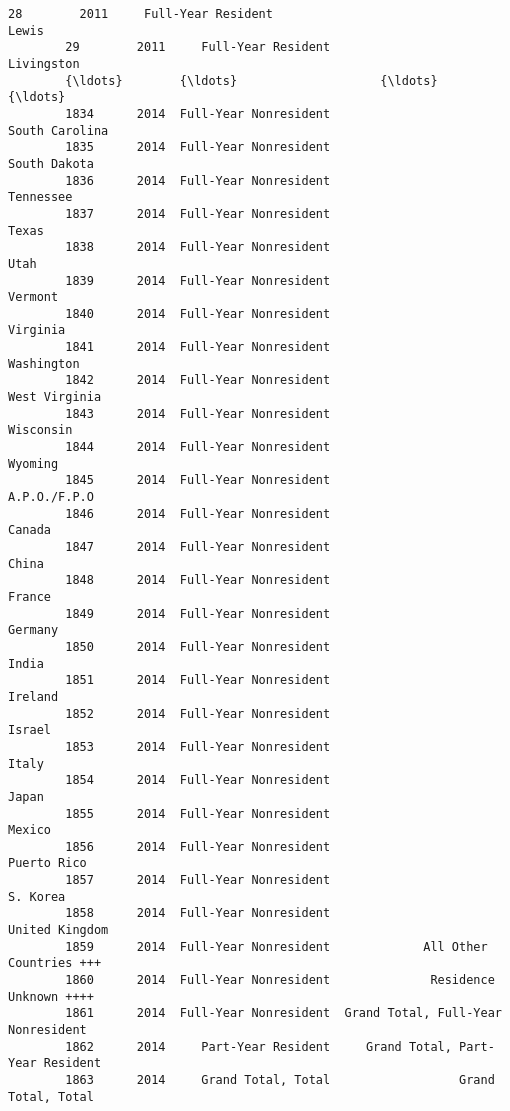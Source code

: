 \documentclass[11pt]{article}
\begin{document}
\begin{Verbatim}[commandchars=\\\{\}]
        28        2011     Full-Year Resident                               Lewis   
        29        2011     Full-Year Resident                          Livingston   
        {\ldots}        {\ldots}                    {\ldots}                                 {\ldots}   
        1834      2014  Full-Year Nonresident                      South Carolina   
        1835      2014  Full-Year Nonresident                        South Dakota   
        1836      2014  Full-Year Nonresident                           Tennessee   
        1837      2014  Full-Year Nonresident                               Texas   
        1838      2014  Full-Year Nonresident                                Utah   
        1839      2014  Full-Year Nonresident                             Vermont   
        1840      2014  Full-Year Nonresident                            Virginia   
        1841      2014  Full-Year Nonresident                          Washington   
        1842      2014  Full-Year Nonresident                       West Virginia   
        1843      2014  Full-Year Nonresident                           Wisconsin   
        1844      2014  Full-Year Nonresident                             Wyoming   
        1845      2014  Full-Year Nonresident                        A.P.O./F.P.O   
        1846      2014  Full-Year Nonresident                              Canada   
        1847      2014  Full-Year Nonresident                               China   
        1848      2014  Full-Year Nonresident                              France   
        1849      2014  Full-Year Nonresident                             Germany   
        1850      2014  Full-Year Nonresident                               India   
        1851      2014  Full-Year Nonresident                             Ireland   
        1852      2014  Full-Year Nonresident                              Israel   
        1853      2014  Full-Year Nonresident                               Italy   
        1854      2014  Full-Year Nonresident                               Japan   
        1855      2014  Full-Year Nonresident                              Mexico   
        1856      2014  Full-Year Nonresident                         Puerto Rico   
        1857      2014  Full-Year Nonresident                            S. Korea   
        1858      2014  Full-Year Nonresident                      United Kingdom   
        1859      2014  Full-Year Nonresident             All Other Countries +++   
        1860      2014  Full-Year Nonresident              Residence Unknown ++++   
        1861      2014  Full-Year Nonresident  Grand Total, Full-Year Nonresident   
        1862      2014     Part-Year Resident     Grand Total, Part-Year Resident   
        1863      2014     Grand Total, Total                  Grand Total, Total   
        

\end{Verbatim}
\end{document}

